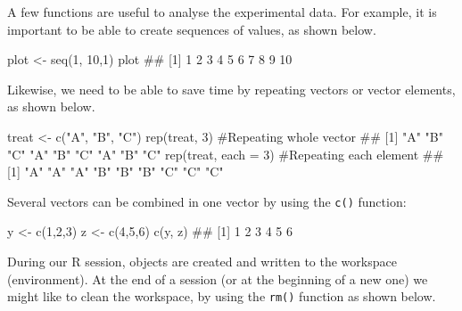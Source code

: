 \documentclass[a4paper,12pt,oneside]{book}
\newenvironment{Shaded}{\begin{snugshade}}{\end{snugshade}}
\newcommand{\DecValTok}[1]{#1}
\newcommand{\StringTok}[1]{#1}
\newcommand{\CommentTok}[1]{#1}
\newcommand{\DocumentationTok}[1]{#1}
\newcommand{\OtherTok}[1]{#1}
\newcommand{\FunctionTok}[1]{#1}
\newcommand{\AttributeTok}[1]{#1}
\newcommand{\NormalTok}[1]{#1}
\begin{document}
A few functions are useful to analyse the experimental data. For example, it is important to be able to create sequences of values, as shown below.

\begin{Shaded}
\begin{Highlighting}[]
\NormalTok{plot  }\OtherTok{\textless{}{-}}  \FunctionTok{seq}\NormalTok{(}\DecValTok{1}\NormalTok{, }\DecValTok{10}\NormalTok{,}\DecValTok{1}\NormalTok{)}
\NormalTok{plot}
\DocumentationTok{\#\#  [1]  1  2  3  4  5  6  7  8  9 10}
\end{Highlighting}
\end{Shaded}

Likewise, we need to be able to save time by repeating vectors or vector elements, as shown below.

\begin{Shaded}
\begin{Highlighting}[]
\NormalTok{treat }\OtherTok{\textless{}{-}} \FunctionTok{c}\NormalTok{(}\StringTok{"A"}\NormalTok{, }\StringTok{"B"}\NormalTok{, }\StringTok{"C"}\NormalTok{)}
\FunctionTok{rep}\NormalTok{(treat, }\DecValTok{3}\NormalTok{) }\CommentTok{\#Repeating whole vector}
\DocumentationTok{\#\# [1] "A" "B" "C" "A" "B" "C" "A" "B" "C"}
\FunctionTok{rep}\NormalTok{(treat, }\AttributeTok{each =} \DecValTok{3}\NormalTok{) }\CommentTok{\#Repeating each element}
\DocumentationTok{\#\# [1] "A" "A" "A" "B" "B" "B" "C" "C" "C"}
\end{Highlighting}
\end{Shaded}

Several vectors can be combined in one vector by using the \texttt{c()} function:

\begin{Shaded}
\begin{Highlighting}[]
\NormalTok{y }\OtherTok{\textless{}{-}} \FunctionTok{c}\NormalTok{(}\DecValTok{1}\NormalTok{,}\DecValTok{2}\NormalTok{,}\DecValTok{3}\NormalTok{)}
\NormalTok{z }\OtherTok{\textless{}{-}} \FunctionTok{c}\NormalTok{(}\DecValTok{4}\NormalTok{,}\DecValTok{5}\NormalTok{,}\DecValTok{6}\NormalTok{)}
\FunctionTok{c}\NormalTok{(y, z)}
\DocumentationTok{\#\# [1] 1 2 3 4 5 6}
\end{Highlighting}
\end{Shaded}

During our R session, objects are created and written to the workspace (environment). At the end of a session (or at the beginning of a new one) we might like to clean the workspace, by using the \texttt{rm()} function as shown below.
\end{document}
